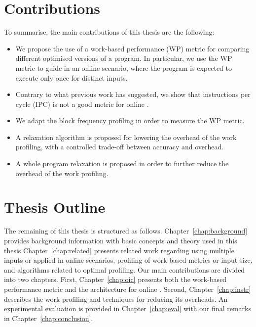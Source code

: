 \section{Contributions}


To summarise, the main contributions of this thesis are the following:
\begin{itemize}
\item We propose the use of a work-based performance (WP) metric for comparing different optimised versions of a program.
      In particular, we use the WP metric to guide {\itercomp} in an online scenario, where the program is expected to execute only once for distinct inputs.
       
\item Contrary to what previous work has suggested, we show that instructions per cycle (IPC) is not a good metric for online {\itercomp}.
\item We adapt the block frequency profiling in order to measure the WP metric.
\item A relaxation algorithm is proposed for lowering the overhead of the work profiling, with a controlled trade-off between accuracy and overhead.
\item A whole program relaxation is proposed in order to further reduce the overhead of the work profiling.
\end{itemize}

\section{Thesis Outline}

The remaining of this thesis is structured as follows.
Chapter~\ref{chap:background} provides background information with basic concepts and theory used in this thesis
Chapter~\ref{chap:related} presents related work regarding {\itercomp} using multiple inputs or applied in online scenarios,
profiling of work-based metrics or input size, and algorithms related to optimal profiling.
Our main contributions are divided into two chapters.
First, Chapter~\ref{chap:oic} presents both the work-based performance metric and the architecture for online {\itercomp}.
Second, Chapter~\ref{chap:instr} describes the work profiling and techniques for reducing its overheads.
An experimental evaluation is provided in Chapter~\ref{chap:eval} with our final remarks in Chapter~\ref{chap:conclusion}.

